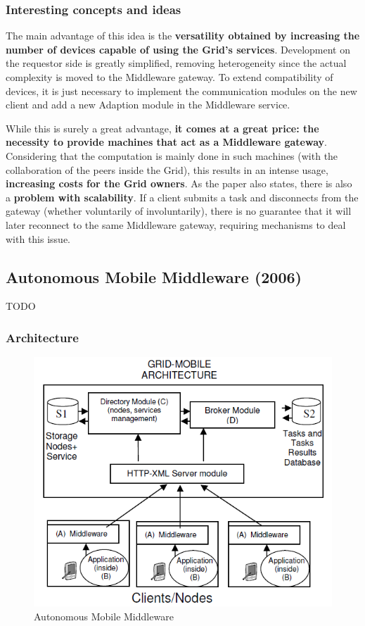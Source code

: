 \subsubsection{Interesting concepts and ideas}
The main advantage of this idea is the \textbf{versatility obtained by increasing the number of devices capable of using the Grid's services}. Development on the requestor side is greatly simplified, removing heterogeneity since the actual complexity is moved to the Middleware gateway. To extend compatibility of devices, it is just necessary to implement the communication modules on the new client and add a new Adaption module in the Middleware service.

While this is surely a great advantage, \textbf{it comes at a great price: the necessity to provide machines that act as a Middleware gateway}. Considering that the computation is mainly done in such machines (with the collaboration of the peers inside the Grid), this results in an intense usage, \textbf{increasing costs for the Grid owners}.
As the paper also states, there is also a \textbf{problem with scalability}. If a client submits a task and disconnects from the gateway (whether voluntarily of involuntarily), there is no guarantee that it will later reconnect to the same Middleware gateway, requiring mechanisms to deal with this issue.

\subsection{Autonomous Mobile Middleware (2006)}
TODO

\subsubsection{Architecture}
\begin{figure}[H]
    \centering
    \includegraphics[scale=0.9]{document/chapters/chapter_3/images/2006_architecture.png}
    \caption{Autonomous Mobile Middleware \cite{towards_a_middleware_for_mobile_grids}}
    \label{fig:2006_architecture}
\end{figure}

